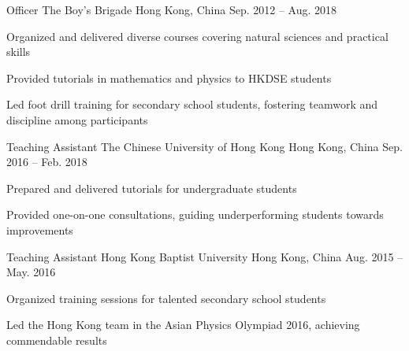 

\begin{cventries}

  \cventry
    {Officer} %
    {The Boy's Brigade} %
    {Hong Kong, China} %
    {Sep. 2012 -- Aug. 2018} %
    {
      \begin{cvitems} %
        \item{Organized and delivered diverse courses covering natural sciences and practical skills}
        \item{Provided tutorials in mathematics and physics to HKDSE students}
        \item{Led foot drill training for secondary school students, fostering teamwork and discipline among participants}
      \end{cvitems}
    }

  \cventry
    {Teaching Assistant} %
    {The Chinese University of Hong Kong} %
    {Hong Kong, China} %
    {Sep. 2016 -- Feb. 2018} %
    {
      \begin{cvitems} %
        \item{Prepared and delivered tutorials for undergraduate students}
        \item{Provided one-on-one consultations, guiding underperforming students towards improvements}
      \end{cvitems}
    }

  \cventry
    {Teaching Assistant} %
    {Hong Kong Baptist University} %
    {Hong Kong, China} %
    {Aug. 2015 -- May. 2016} %
    {
      \begin{cvitems} %
        \item{Organized training sessions for talented secondary school students}
        \item{Led the Hong Kong team in the Asian Physics Olympiad 2016, achieving commendable results}
      \end{cvitems}
    }


\end{cventries}
